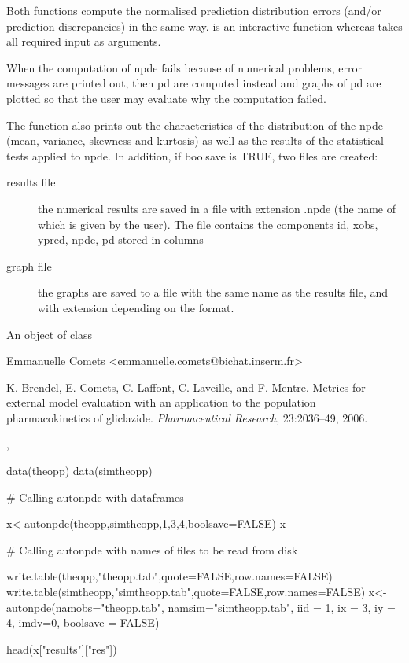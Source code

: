 \documentclass[a4paper]{book}
\begin{document}
\begin{Details}\relax
Both functions compute the normalised prediction distribution errors (and/or
prediction discrepancies) in the same way.  is an interactive
function whereas  takes all required input as arguments.

When the computation of npde fails because of numerical problems, error
messages are printed out, then pd are computed instead and graphs of pd are
plotted so that the user may evaluate why the computation failed.

The function also prints out the characteristics of the distribution of the
npde (mean, variance, skewness and kurtosis) as well as the results of the
statistical tests applied to npde. In addition, if boolsave is TRUE, two files
are created: 
\begin{description}

\item[results file] the numerical results are saved in a file
with extension .npde (the name of which is given by the user). The file
contains the components id, xobs, ypred, npde, pd stored in columns
\item[graph file] the graphs are saved to a file with the same name as the
results file, and with extension depending on the format.

\end{description}

\end{Details}
%
\begin{Value}
An object of class 
\end{Value}
%
\begin{Author}\relax
Emmanuelle Comets <emmanuelle.comets@bichat.inserm.fr>
\end{Author}
%
\begin{References}\relax
K. Brendel, E. Comets, C. Laffont, C. Laveille, and F.
Mentre. Metrics for external model evaluation with an application to the
population pharmacokinetics of gliclazide. \emph{Pharmaceutical Research},
23:2036--49, 2006.
\end{References}
%
\begin{SeeAlso}\relax
{}, 
\end{SeeAlso}
%
\begin{Examples}
\begin{ExampleCode}

data(theopp)
data(simtheopp)

# Calling autonpde with dataframes

x<-autonpde(theopp,simtheopp,1,3,4,boolsave=FALSE)
x

# Calling autonpde with names of files to be read from disk

write.table(theopp,"theopp.tab",quote=FALSE,row.names=FALSE)
write.table(simtheopp,"simtheopp.tab",quote=FALSE,row.names=FALSE)
x<-autonpde(namobs="theopp.tab", namsim="simtheopp.tab", iid = 1,
ix = 3, iy = 4, imdv=0, boolsave = FALSE)

head(x["results"]["res"])

\end{ExampleCode}
\end{Examples}
\end{document}
